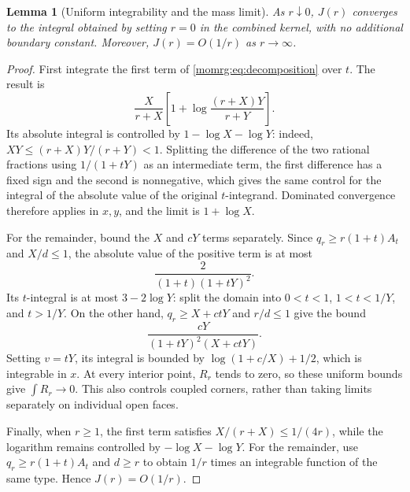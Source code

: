 \documentclass[11pt,a4paper,oneside]{article}
\theoremstyle{plain}
\newtheorem{lemma}[theorem]{Lemma}
\theoremstyle{definition}
\theoremstyle{remark}
\numberwithin{equation}{section}
\begin{document}
\begin{lemma}[Uniform integrability and the mass limit]\label{momrg:lem:domination}
As $r\downarrow0$, $J(r)$ converges to the integral obtained by setting $r=0$ in the combined kernel,
with no additional boundary constant. Moreover, $J(r)=O(1/r)$ as $r\to\infty$.
\end{lemma}
\begin{proof}
First integrate the first term of \eqref{momrg:eq:decomposition} over $t$. The result is
\begin{equation}\label{momrg:eq:main-integrated}
 \frac{X}{r+X}
       \left[1+\log\frac{(r+X)Y}{r+Y}\right].
\end{equation}
Its absolute integral is controlled by $1-\log X-\log Y$:
indeed, $XY\leq(r+X)Y/(r+Y)<1$.
Splitting the difference of the two rational fractions using $1/(1+tY)$ as an intermediate term,
the first difference has a fixed sign and the second is nonnegative,
which gives the same control for the integral of the absolute value of the original $t$-integrand.
Dominated convergence therefore applies in $x,y$, and the limit is $1+\log X$.

For the remainder, bound the $X$ and $cY$ terms separately.
Since $q_r\geq r(1+t)A_t$ and $X/d\leq1$,
the absolute value of the positive term is at most
\begin{equation}\label{momrg:eq:Rplus-bound}
 \frac{2}{(1+t)(1+tY)^2}.
\end{equation}
Its $t$-integral is at most $3-2\log Y$:
split the domain into $0<t<1$, $1<t<1/Y$, and $t>1/Y$.
On the other hand, $q_r\geq X+ctY$ and $r/d\leq1$ give the bound
\begin{equation}\label{momrg:eq:Rminus-bound}
 \frac{cY}{(1+tY)^2(X+ctY)}.
\end{equation}
Setting $v=tY$, its integral is bounded by
$\log(1+c/X)+1/2$, which is integrable in $x$.
At every interior point, $R_r$ tends to zero, so these uniform bounds give $\int R_r\to0$.
This also controls coupled corners, rather than taking limits separately on individual open faces.

Finally, when $r\geq1$, the first term satisfies $X/(r+X)\leq1/(4r)$,
while the logarithm remains controlled by $-\log X-\log Y$.
For the remainder, use $q_r\geq r(1+t)A_t$ and $d\geq r$
to obtain $1/r$ times an integrable function of the same type.
Hence $J(r)=O(1/r)$.
\end{proof}
\end{document}

